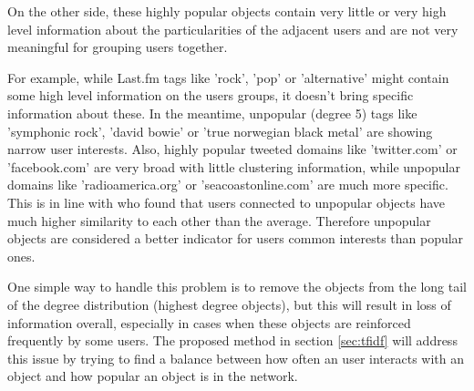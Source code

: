 On the other side, these highly popular objects contain very little or very high
level information about the particularities of the adjacent users and are not
very meaningful for grouping users together. 

For example, while Last.fm tags like 'rock', 'pop' or 'alternative' might
contain some high level information on the users groups, it doesn't bring
specific information about these. In the meantime, unpopular (degree 5) tags
like 'symphonic rock', 'david bowie' or 'true norwegian black metal' are showing
narrow user interests. Also, highly popular tweeted domains like 'twitter.com'
or 'facebook.com' are very broad with little clustering information, while
unpopular domains like 'radioamerica.org' or 'seacoastonline.com' are much more
specific. This is in line with \citet{shang10empirical} who found that users
connected to unpopular objects have much higher similarity to each other than
the average. Therefore unpopular objects are considered a better indicator for
users common interests than popular ones.

One simple way to handle this problem is to remove the objects from the long
tail of the degree distribution (highest degree objects), but this will result
in loss of information overall, especially in cases when these objects are
reinforced frequently by some users. The proposed method in section
\ref{sec:tfidf} will address this issue by trying to find a balance between how
often an user interacts with an object and how popular an object is in the
network.

